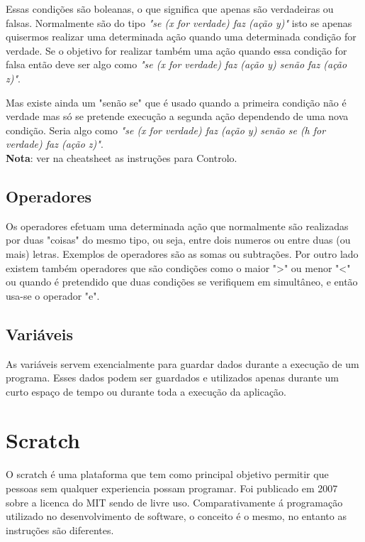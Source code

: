 \documentclass{article}
\begin{document}
Essas condições são boleanas, o que significa que apenas são verdadeiras ou falsas.
Normalmente são do tipo \textit{"se (x for verdade) faz (ação y)"} isto se apenas quisermos realizar uma determinada ação quando uma determinada condição for verdade. Se o objetivo for realizar também uma ação quando essa condição for falsa então deve ser algo como \textit{"se (x for verdade) faz (ação y) senão faz (ação z)"}.\newline

Mas existe ainda um "senão se" que é usado quando a primeira condição não é verdade mas só se pretende execução a segunda ação dependendo de uma nova condição. Seria algo como \textit{"se (x for verdade) faz (ação y) senão se (h for verdade) faz (ação z)"}. \newline \\
\textbf{Nota}: ver na cheatsheet as instruções para Controlo. \\

\subsection{Operadores}
Os operadores efetuam uma determinada ação que normalmente são realizadas por duas "coisas" do mesmo tipo, ou seja, entre dois numeros ou entre duas (ou mais) letras. Exemplos de operadores são as somas ou subtrações. Por outro lado existem também operadores que são condições como o maior ">" ou menor "<" ou quando é pretendido que duas condições se verifiquem em simultâneo, e então usa-se o operador "e".

\subsection{Variáveis}
As variáveis servem exencialmente para guardar dados durante a execução de um programa. Esses dados podem ser guardados e utilizados apenas durante um curto espaço de tempo ou durante toda a execução da aplicação.

\section{Scratch}
O scratch é uma plataforma que tem como principal objetivo permitir que pessoas sem qualquer experiencia possam programar. Foi publicado em 2007 sobre a licenca do MIT sendo de livre uso.\newline
Comparativamente á programação utilizado no desenvolvimento de software, o conceito é o mesmo, no entanto as instruções são diferentes.
\end{document}
